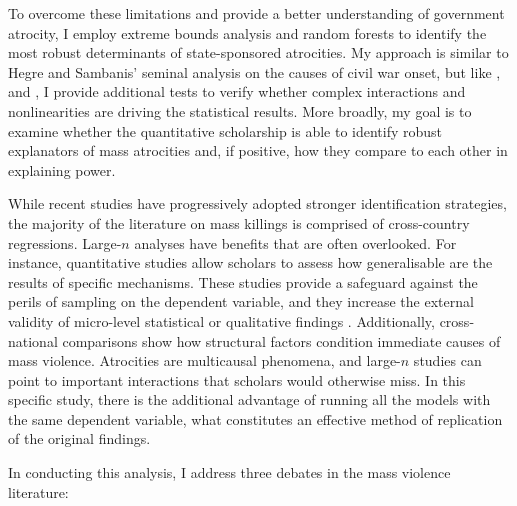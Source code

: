 \documentclass[a4paper,12pt]{article}
\begin{document}
To overcome these limitations and provide a better understanding of government atrocity, I employ extreme bounds analysis and random forests to identify the most robust determinants of state-sponsored atrocities. My approach is similar to Hegre and Sambanis' \citeyear{hegre2006sensitivity} seminal analysis on the causes of civil war onset, but like \citet{bell2015examining}, \citep{hill2014empirical} and \citet{jones2018there}, I provide additional tests to verify whether complex interactions and nonlinearities are driving the statistical results. More broadly, my goal is to examine whether the quantitative scholarship is able to identify robust explanators of mass atrocities and, if positive, how they compare to each other in explaining power. 

While recent studies have progressively adopted stronger identification strategies, the majority of the literature on mass killings is comprised of cross-country regressions. Large-$n$ analyses have benefits that are often overlooked. For instance, quantitative studies allow scholars to assess how generalisable are the results of specific mechanisms. These studies provide a safeguard against the perils of sampling on the dependent variable, and they increase the external validity of micro-level statistical or qualitative findings \citep{bell2015examining,king1994designing}. Additionally, cross-national comparisons show how structural factors condition immediate causes of mass violence. Atrocities are multicausal phenomena, and large-$n$ studies can point to important interactions that scholars would otherwise miss. In this specific study, there is the additional advantage of running all the models with the same dependent variable, what constitutes an effective method of replication of the original findings.

In conducting this analysis, I address three debates in the mass violence literature:
	
\end{document}
